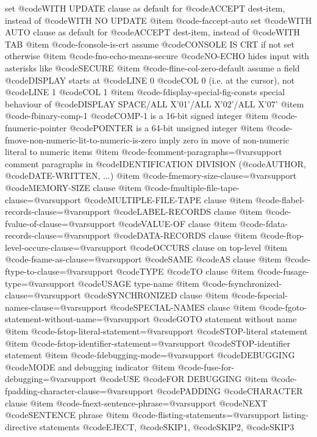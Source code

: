 set @code{WITH UPDATE} clause as default for @code{ACCEPT} dest-item, instead of @code{WITH NO UPDATE}
@item @code{-faccept-auto}
set @code{WITH AUTO} clause as default for @code{ACCEPT} dest-item, instead of @code{WITH TAB}
@item @code{-fconsole-is-crt}
assume @code{CONSOLE IS CRT} if not set otherwise
@item @code{-fno-echo-means-secure}
@code{NO-ECHO} hides input with asterisks like @code{SECURE}
@item @code{-fline-col-zero-default}
assume a field @code{DISPLAY} starts at @code{LINE} 0 @code{COL} 0 (i.e. at the cursor), not @code{LINE} 1 @code{COL} 1
@item @code{-fdisplay-special-fig-consts}
special behaviour of @code{DISPLAY SPACE}/ALL X'01'/ALL X'02'/ALL X'07'
@item @code{-fbinary-comp-1}
@code{COMP}-1 is a 16-bit signed integer
@item @code{-fnumeric-pointer}
@code{POINTER} is a 64-bit unsigned integer
@item @code{-fmove-non-numeric-lit-to-numeric-is-zero}
imply zero in move of non-numeric literal to numeric items
@item @code{-fcomment-paragraphs=@var{support}}
comment paragraphs in @code{IDENTIFICATION DIVISION} (@code{AUTHOR}, @code{DATE-WRITTEN}, ...)
@item @code{-fmemory-size-clause=@var{support}}
@code{MEMORY-SIZE} clause
@item @code{-fmultiple-file-tape-clause=@var{support}}
@code{MULTIPLE-FILE-TAPE} clause
@item @code{-flabel-records-clause=@var{support}}
@code{LABEL-RECORDS} clause
@item @code{-fvalue-of-clause=@var{support}}
@code{VALUE-OF} clause
@item @code{-fdata-records-clause=@var{support}}
@code{DATA-RECORDS} clause
@item @code{-ftop-level-occurs-clause=@var{support}}
@code{OCCURS} clause on top-level
@item @code{-fsame-as-clause=@var{support}}
@code{SAME} @code{AS} clause
@item @code{-ftype-to-clause=@var{support}}
@code{TYPE} @code{TO} clause
@item @code{-fusage-type=@var{support}}
@code{USAGE} type-name
@item @code{-fsynchronized-clause=@var{support}}
@code{SYNCHRONIZED} clause
@item @code{-fspecial-names-clause=@var{support}}
@code{SPECIAL-NAMES} clause
@item @code{-fgoto-statement-without-name=@var{support}}
@code{GOTO} statement without name
@item @code{-fstop-literal-statement=@var{support}}
@code{STOP}-literal statement
@item @code{-fstop-identifier-statement=@var{support}}
@code{STOP}-identifier statement
@item @code{-fdebugging-mode=@var{support}}
@code{DEBUGGING} @code{MODE} and debugging indicator
@item @code{-fuse-for-debugging=@var{support}}
@code{USE} @code{FOR DEBUGGING}
@item @code{-fpadding-character-clause=@var{support}}
@code{PADDING} @code{CHARACTER} clause
@item @code{-fnext-sentence-phrase=@var{support}}
@code{NEXT} @code{SENTENCE} phrase
@item @code{-flisting-statements=@var{support}}
listing-directive statements @code{EJECT}, @code{SKIP}1, @code{SKIP}2, @code{SKIP}3
